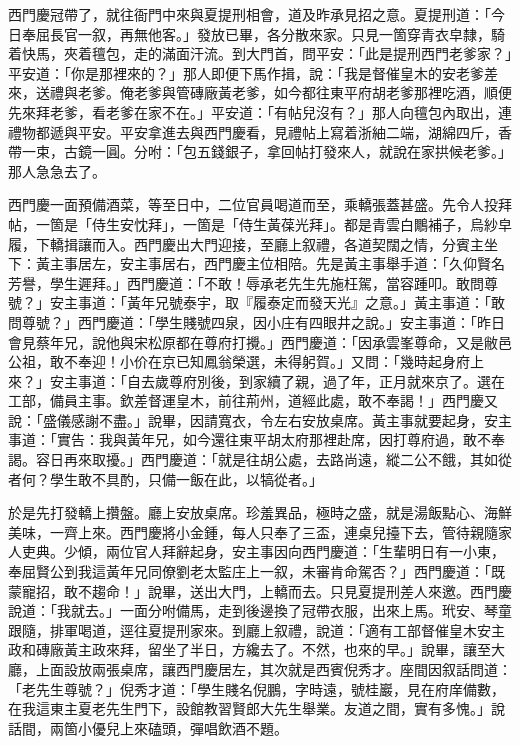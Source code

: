 西門慶冠帶了，就往衙門中來與夏提刑相會，道及昨承見招之意。夏提刑道：「今日奉屈長官一叙，再無他客。」發放已畢，各分散來家。只見一箇穿青衣皁隸，騎着快馬，夾着氊包，走的滿面汗流。到大門首，問平安：「此是提刑西門老爹家？」平安道：「你是那裡來的？」那人即便下馬作揖，說：「我是督催皇木的安老爹差來，送禮與老爹。俺老爹與管磚廠黃老爹，如今都往東平府胡老爹那裡吃酒，順便先來拜老爹，看老爹在家不在。」平安道：「有帖兒沒有？」那人向氊包內取出，連禮物都遞與平安。平安拿進去與西門慶看，見禮帖上寫着浙紬二端，湖綿四斤，香帶一束，古鏡一圓。分咐：「包五錢銀子，拿回帖打發來人，就說在家拱候老爹。」那人急急去了。

西門慶一面預備酒菜，等至日中，二位官員喝道而至，乘轎張蓋甚盛。先令人投拜帖，一箇是「侍生安忱拜」，一箇是「侍生黃葆光拜」。都是青雲白鷳補子，烏紗皁履，下轎揖讓而入。西門慶出大門迎接，至廳上叙禮，各道契闊之情，分賓主坐下：黃主事居左，安主事居右，西門慶主位相陪。先是黃主事舉手道：「久仰賢名芳譽，學生遲拜。」西門慶道：「不敢！辱承老先生先施枉駕，當容踵叩。敢問尊號？」安主事道：「黃年兄號泰宇，取『履泰定而發天光』之意。」黃主事道：「敢問尊號？」西門慶道：「學生賤號四泉，因小庄有四眼井之說。」{}安主事道：「昨日會見蔡年兄，說他與宋松原都在尊府打攪。」西門慶道：「因承雲峯尊命，又是敝邑公祖，敢不奉迎！小价在京已知鳳翁榮選，未得躬賀。」又問：「幾時起身府上來？」安主事道：「自去歲尊府別後，到家續了親，過了年，正月就來京了。選在工部，備員主事。欽差督運皇木，前往荊州，道經此處，敢不奉謁！」西門慶又說：「盛儀感謝不盡。」說畢，因請寬衣，令左右安放桌席。黃主事就要起身，安主事道：「實告：我與黃年兄，如今還往東平胡太府那裡赴席，因打尊府過，敢不奉謁。容日再來取擾。」西門慶道：「就是往胡公處，去路尚遠，縱二公不餓，其如從者何？學生敢不具酌，只備一飯在此，以犒從者。」

於是先打發轎上攢盤。廳上安放桌席。珍羞異品，極時之盛，就是湯飯點心、海鮮美味，一齊上來。西門慶將小金鍾，每人只奉了三盃，連桌兒擡下去，管待親隨家人吏典。少傾，兩位官人拜辭起身，安主事因向西門慶道：「生輩明日有一小東，奉屈賢公到我這黃年兄同僚劉老太監庄上一叙，未審肯命駕否？」西門慶道：「既蒙寵招，敢不趨命！」說畢，送出大門，上轎而去。只見夏提刑差人來邀。西門慶說道：「我就去。」一面分咐備馬，走到後邊換了冠帶衣服，出來上馬。玳安、琴童跟隨，排軍喝道，逕往夏提刑家來。到廳上叙禮，說道：「適有工部督催皇木安主政和磚廠黃主政來拜，留坐了半日，方纔去了。不然，也來的早。」說畢，讓至大廳，上面設放兩張桌席，讓西門慶居左，其次就是西賓倪秀才。{}座間因叙話問道：「老先生尊號？」倪秀才道：「學生賤名倪鵬，字時遠，號桂巖，見在府庠備數，在我這東主夏老先生門下，設館教習賢郎大先生舉業。友道之間，實有多愧。」說話間，兩箇小優兒上來磕頭，彈唱飲酒不題。

